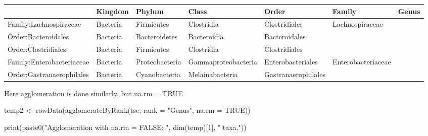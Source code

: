 \documentclass[
]{book}
\newenvironment{Shaded}{\begin{snugshade}}{\end{snugshade}}
\newcommand{\AttributeTok}[1]{\textcolor[rgb]{0.77,0.63,0.00}{#1}}
\newcommand{\CommentTok}[1]{\textcolor[rgb]{0.56,0.35,0.01}{\textit{#1}}}
\newcommand{\ConstantTok}[1]{\textcolor[rgb]{0.00,0.00,0.00}{#1}}
\newcommand{\DecValTok}[1]{\textcolor[rgb]{0.00,0.00,0.81}{#1}}
\newcommand{\FunctionTok}[1]{\textcolor[rgb]{0.00,0.00,0.00}{#1}}
\newcommand{\NormalTok}[1]{#1}
\newcommand{\OtherTok}[1]{\textcolor[rgb]{0.56,0.35,0.01}{#1}}
\newcommand{\SpecialCharTok}[1]{\textcolor[rgb]{0.00,0.00,0.00}{#1}}
\newcommand{\StringTok}[1]{\textcolor[rgb]{0.31,0.60,0.02}{#1}}
\begin{document}
\begin{Shaded}
\end{Shaded}

\begin{table}
\centering
\begin{tabular}{l|l|l|l|l|l|l}
\hline
  & Kingdom & Phylum & Class & Order & Family & Genus\\
\hline
Family:Lachnospiraceae & Bacteria & Firmicutes & Clostridia & Clostridiales & Lachnospiraceae & \\
\hline
Order:Bacteroidales & Bacteria & Bacteroidetes & Bacteroidia & Bacteroidales &  & \\
\hline
Order:Clostridiales & Bacteria & Firmicutes & Clostridia & Clostridiales &  & \\
\hline
Family:Enterobacteriaceae & Bacteria & Proteobacteria & Gammaproteobacteria & Enterobacteriales & Enterobacteriaceae & \\
\hline
Order:Gastranaerophilales & Bacteria & Cyanobacteria & Melainabacteria & Gastranaerophilales &  & \\
\hline
\end{tabular}
\end{table}

Here agglomeration is done similarly, but na.rm = TRUE

\begin{Shaded}
\begin{Highlighting}[]
\NormalTok{temp2 }\OtherTok{\textless{}{-}} \FunctionTok{rowData}\NormalTok{(}\FunctionTok{agglomerateByRank}\NormalTok{(tse, }\AttributeTok{rank =} \StringTok{"Genus"}\NormalTok{, }\AttributeTok{na.rm =} \ConstantTok{TRUE}\NormalTok{))}

\FunctionTok{print}\NormalTok{(}\FunctionTok{paste0}\NormalTok{(}\StringTok{"Agglomeration with na.rm = FALSE: "}\NormalTok{, }\FunctionTok{dim}\NormalTok{(temp)[}\DecValTok{1}\NormalTok{], }\StringTok{" taxa."}\NormalTok{))}
\end{Highlighting}
\end{Shaded}
\end{document}
